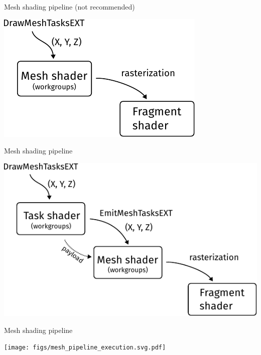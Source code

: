 \documentclass[aspectratio=169,t,xcolor=table]{beamer}
\begin{document}
\begin{frame}{Mesh shading pipeline (not recommended)}

    \footnotesize

    \begin{center}
        \includegraphics{figs/mesh_pipeline.svg.pdf}
    \end{center}

\end{frame}

\begin{frame}{Mesh shading pipeline}

    \footnotesize

    \begin{center}
        \includegraphics{figs/mesh_pipeline_with_task.svg.pdf}
    \end{center}

\end{frame}

\begin{frame}{Mesh shading pipeline}

    \footnotesize

    \begin{center}
        \texttt{[image: figs/mesh\_pipeline\_execution.svg.pdf]}
    \end{center}

\end{frame}
\end{document}
